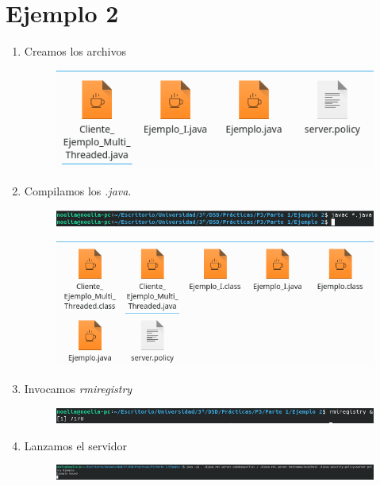 \documentclass{article}
\begin{document}
	\section{Ejemplo 2}
	\begin{enumerate}
		\item Creamos los archivos
		\begin{figure}[H]
			\centering
			\includegraphics[totalheight=2cm]{img/10.png}
		\end{figure}
		\item Compilamos los {\it .java}.
		\begin{figure}[H]
			\centering
			\includegraphics[totalheight=0.5cm]{img/11.png}
		\end{figure}
		\begin{figure}[H]
			\centering
			\includegraphics[totalheight=4cm]{img/12.png}
		\end{figure}
		\item Invocamos {\it rmiregistry}
		\begin{figure}[H]
			\centering
			\includegraphics[totalheight=0.55cm]{img/13.png}
		\end{figure}
		\item Lanzamos el servidor
		\begin{figure}[H]
			\centering
			\includegraphics[totalheight=0.6cm]{img/14.png}

\end{figure}
\end{enumerate}
\end{document}
